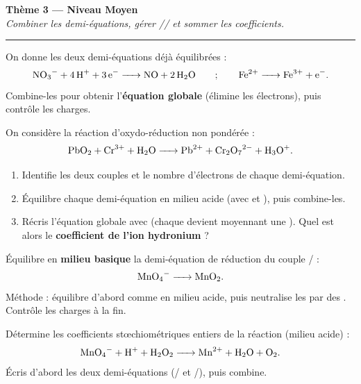 \documentclass[11pt,a4paper]{article}
\newcounter{exo}
\begin{document}
\begin{center}
{\LARGE\bfseries\color{primarydark}Thème 3 — Niveau Moyen}\\[2pt]
{\small\itshape Combiner les demi-équations, gérer // et sommer les coefficients.}\\[-4pt]
{\color{primary}\rule{\textwidth}{1pt}}
\end{center}

\begin{exo}
On donne les deux demi-équations déjà équilibrées :
\[
\ce{NO3^- + 4 H+ + 3 e^- -> NO + 2 H2O} \qquad ; \qquad \ce{Fe^{2+} -> Fe^{3+} + e^-}.
\]
Combine-les pour obtenir l'\textbf{équation globale} (élimine les électrons), puis contrôle les
charges.
\end{exo}

\begin{exo}
On considère la réaction d'oxydo-réduction non pondérée :
\[
\ce{PbO2 + Cr^{3+} + H2O -> Pb^{2+} + Cr2O7^{2-} + H3O+}.
\]
\begin{enumerate}[label=(\alph*),leftmargin=2em,topsep=1pt,itemsep=1pt]
  \item Identifie les deux couples et le nombre d'électrons de chaque demi-équation.
  \item Équilibre chaque demi-équation en milieu acide (avec  et ), puis combine-les.
  \item Récris l'équation globale avec  (chaque  devient  moyennant une ).
        Quel est alors le \textbf{coefficient de l'ion hydronium}  ?
\end{enumerate}
\end{exo}

\begin{exo}
Équilibre en \textbf{milieu basique} la demi-équation de réduction du couple / :
\[
\ce{MnO4^- -> MnO2}.
\]
Méthode : équilibre d'abord comme en milieu acide, puis neutralise les  par des .
Contrôle les charges à la fin.
\end{exo}

\begin{exo}
Détermine les coefficients stœchiométriques entiers de la réaction (milieu acide) :
\[
\ce{MnO4^- + H+ + H2O2 -> Mn^{2+} + H2O + O2}.
\]
Écris d'abord les deux demi-équations (/ et /), puis combine.
\end{exo}
\end{document}
